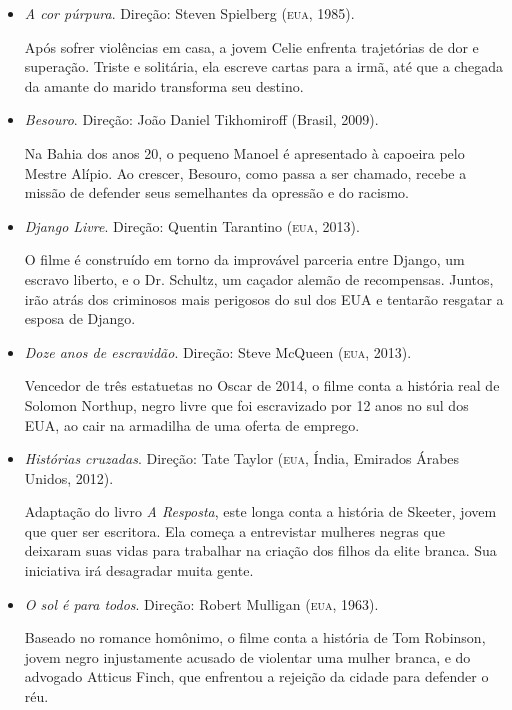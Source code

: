 \documentclass[12pt]{extarticle}
\begin{document}
\begin{itemize}
\item
\textit{A cor púrpura}. Direção: Steven Spielberg (\textsc{eua}, 1985).

Após sofrer violências em casa, a jovem Celie enfrenta trajetórias de
dor e superação. Triste e solitária, ela escreve cartas para a irmã, até
que a chegada da amante do marido transforma seu destino.

\item
\textit{Besouro}. Direção: João Daniel Tikhomiroff (Brasil, 2009).

Na Bahia dos anos 20, o pequeno Manoel é apresentado à capoeira pelo
Mestre Alípio. Ao crescer, Besouro, como passa a ser chamado, recebe a
missão de defender seus semelhantes da opressão e do racismo.

\item
\textit{Django Livre}. Direção: Quentin Tarantino (\textsc{eua}, 2013).

O filme é construído em torno da improvável parceria entre Django, um
escravo liberto, e o Dr. Schultz, um caçador alemão de recompensas.
Juntos, irão atrás dos criminosos mais perigosos do sul dos EUA e
tentarão resgatar a esposa de Django.

\item
\textit{Doze anos de escravidão}. Direção: Steve McQueen (\textsc{eua}, 2013).

Vencedor de três estatuetas no Oscar de 2014, o filme conta a história
real de Solomon Northup, negro livre que foi escravizado por 12 anos no
sul dos EUA, ao cair na armadilha de uma oferta de emprego.

\item
\textit{Histórias cruzadas}. Direção: Tate Taylor (\textsc{eua}, Índia,
Emirados Árabes Unidos, 2012).

Adaptação do livro \emph{A Resposta}, este longa conta a história de
Skeeter, jovem que quer ser escritora. Ela começa a entrevistar mulheres
negras que deixaram suas vidas para trabalhar na criação dos filhos da
elite branca. Sua iniciativa irá desagradar muita gente.

\item
\textit{O sol é para todos}. Direção: Robert Mulligan (\textsc{eua}, 1963).

Baseado no romance homônimo, o filme conta a história de Tom Robinson,
jovem negro injustamente acusado de violentar uma mulher branca, e do
advogado Atticus Finch, que enfrentou a rejeição da cidade para defender
o réu.
\end{itemize}
\end{document}
